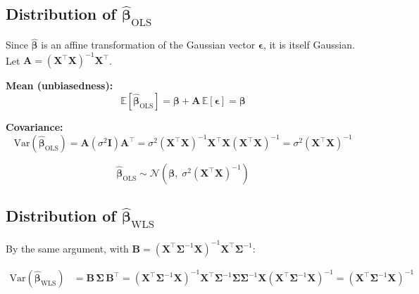 \documentclass[12pt,a4paper]{article}
\begin{document}
\subsection{Distribution of \texorpdfstring{$\hat{\boldsymbol{\beta}}_{\mathrm{OLS}}$}{OLS}}

Since $\hat{\boldsymbol{\beta}}$ is an affine transformation of the Gaussian vector
$\boldsymbol{\epsilon}$, it is itself Gaussian. Let $\mathbf{A} = (\mathbf{X}^\top\mathbf{X})^{-1}\mathbf{X}^\top$.

\textbf{Mean (unbiasedness):}
\begin{equation}
    \mathbb{E}[\hat{\boldsymbol{\beta}}_{\mathrm{OLS}}]
    = \boldsymbol{\beta} + \mathbf{A}\,\mathbb{E}[\boldsymbol{\epsilon}]
    = \boldsymbol{\beta}
\end{equation}

\textbf{Covariance:}
\begin{equation}
    \mathrm{Var}(\hat{\boldsymbol{\beta}}_{\mathrm{OLS}})
    = \mathbf{A}(\sigma^2\mathbf{I})\mathbf{A}^\top
    = \sigma^2(\mathbf{X}^\top\mathbf{X})^{-1}\mathbf{X}^\top\mathbf{X}(\mathbf{X}^\top\mathbf{X})^{-1}
    = \sigma^2(\mathbf{X}^\top\mathbf{X})^{-1}
\end{equation}

\begin{equation}
    \boxed{\hat{\boldsymbol{\beta}}_{\mathrm{OLS}} \sim
    \mathcal{N}\!\left(\boldsymbol{\beta},\; \sigma^2(\mathbf{X}^\top\mathbf{X})^{-1}\right)}
\end{equation}

\subsection{Distribution of \texorpdfstring{$\hat{\boldsymbol{\beta}}_{\mathrm{WLS}}$}{WLS}}

By the same argument, with $\mathbf{B} = (\mathbf{X}^\top\boldsymbol{\Sigma}^{-1}\mathbf{X})^{-1}
\mathbf{X}^\top\boldsymbol{\Sigma}^{-1}$:

\begin{align}
    \mathrm{Var}(\hat{\boldsymbol{\beta}}_{\mathrm{WLS}})
    &= \mathbf{B}\,\boldsymbol{\Sigma}\,\mathbf{B}^\top
     = (\mathbf{X}^\top\boldsymbol{\Sigma}^{-1}\mathbf{X})^{-1}
       \mathbf{X}^\top\boldsymbol{\Sigma}^{-1}\boldsymbol{\Sigma}
       \boldsymbol{\Sigma}^{-1}\mathbf{X}
       (\mathbf{X}^\top\boldsymbol{\Sigma}^{-1}\mathbf{X})^{-1}
     = (\mathbf{X}^\top\boldsymbol{\Sigma}^{-1}\mathbf{X})^{-1}
\end{align}
\end{document}
